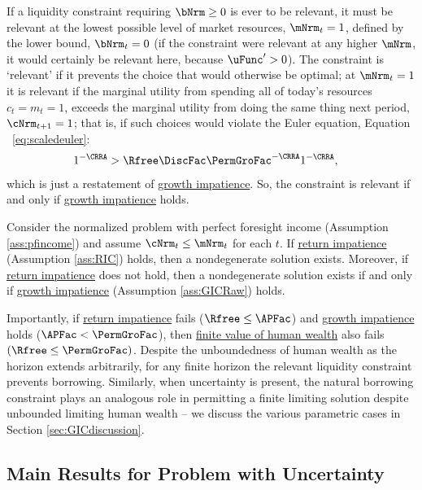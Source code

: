\documentclass[BufferStockTheory]{subfiles}
\begin{document}
If a liquidity constraint requiring $\bNrm \geq 0$ is ever to be relevant, it must be relevant at the lowest possible level of market resources, $\mNrm_{t}=1$, defined by the lower bound, $\bNrm_{t}=0$ (if the constraint were relevant at any higher $\mNrm$, it would certainly be relevant here, because $\uFunc^{\prime}>0$).
The constraint is `relevant' if it prevents the choice that would otherwise be optimal; at $\mNrm_{t}=1$ it is relevant if the marginal utility from spending all of today's resources $c_{t}=m_{t}=1$, exceeds the marginal utility from doing the same thing next period, $\cNrm_{t+1}=1$; that is, if such choices would violate the Euler equation, Equation ~\eqref{eq:scaledeuler}:
\begin{align}
  1^{-\CRRA}  & > \Rfree \DiscFac \PermGroFac^{-\CRRA}1^{-\CRRA},  \label{eq:LiqConstrBinds}
\end{align}
which is just a restatement of \hyperlink{GIC}{growth impatience}.
So, the constraint is relevant if and only if \hyperlink{GICRaw}{growth impatience} holds.


\begin{proposition}\label{prop:PFCExist}
Consider the normalized problem with perfect foresight income (Assumption \ref{ass:pfincome}) and assume $\cNrm_{t}\leq \mNrm_{t}$ for each $t$. If \hyperlink{RIC}{return impatience} (Assumption \ref{ass:RIC}) holds, then a nondegenerate solution exists. Moreover, if \hyperlink{RIC}{return impatience} does not hold, then a nondegenerate solution exists if and only if \hyperlink{GICRaw}{growth impatience} (Assumption \ref{ass:GICRaw}) holds. 
\end{proposition}

Importantly, if \hyperlink{RIC}{return impatience} fails ($\Rfree\leq \APFac$) and \hyperlink{GIC}{growth impatience} holds ($\APFac<\PermGroFac$), then \hyperlink{FHWC}{finite value of human wealth} also fails $(\Rfree \leq \PermGroFac)$.
Despite the unboundedness of human wealth as the horizon extends arbitrarily, for any finite horizon the relevant liquidity constraint prevents borrowing.
Similarly, when uncertainty is present, the natural borrowing constraint plays an analogous role in permitting a finite limiting solution despite unbounded limiting human wealth -- we discuss the various parametric cases in Section \ref{sec:GICdiscussion}.



\hypertarget{limsolexists}{}
\subsection{Main Results for Problem with Uncertainty}\label{subsec:limSolExists}
\end{document}
